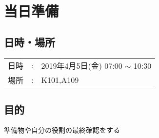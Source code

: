 
%
\section{当日準備}


\subsection{日時・場所}
\begin{tabular}{p{}rp{}}
  日時 & : & 2019年4月5日(金) 07:00 $\sim$ 10:30\\ %
  場所 & : & K101,A109                                 %
\end{tabular}

\vspace{-5mm}
\subsection{目的}
準備物や自分の役割の最終確認をする

\vspace{-5mm}
